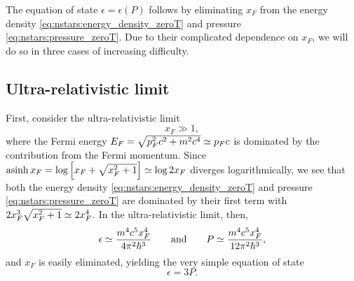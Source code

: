The equation of state $\epsilon = \epsilon(P)$ follows by eliminating $x_F$ from the energy density \eqref{eq:nstars:energy_density_zeroT} and pressure \eqref{eq:nstars:pressure_zeroT}.
Due to their complicated dependence on $x_F$, we will do so in three cases of increasing difficulty.


\subsection{Ultra-relativistic limit}
\label{sec:nstars:ur_limit}

First, consider the ultra-relativistic limit
\begin{equation}
	x_F \gg 1 , 
\label{eq:nstars:ur_limit}
\end{equation}
where the Fermi energy $E_F = \sqrt{p_F^2 c^2 + m^2 c^4} \simeq p_F c$ is dominated by the contribution from the Fermi momentum.
Since $\operatorname{asinh} x_F = \log \left[ x_F + \sqrt{x_F^2 + 1} \right] \simeq \log 2 x_F$ diverges logarithmically, we see that both the energy density \eqref{eq:nstars:energy_density_zeroT} and pressure \eqref{eq:nstars:pressure_zeroT} are dominated by their first term with $2 x_F^3 \sqrt{x_F^2 + 1} \simeq 2 x_F^4$.
In the ultra-relativistic limit, then,
\begin{equation}
	\epsilon \simeq \frac{m^4 c^5 x_F^4}{4 \pi^2 \hbar^3}
	\qquad \text{and} \qquad
	P        \simeq \frac{m^4 c^5 x_F^4}{12 \pi^2 \hbar^3},
\end{equation}
and $x_F$ is easily eliminated, yielding the very simple equation of state
\begin{equation}
	\epsilon = 3 P .
\label{eq:nstars:ur_eos}
\end{equation}

